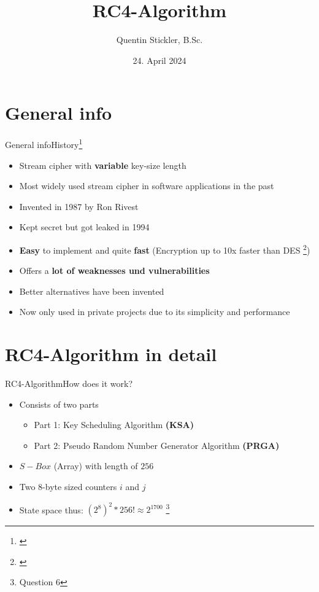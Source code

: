 \documentclass[
	aspectratio=169,	%
	onlytextwidth,		%
	t					%
	]{beamer}
\title[RC4-Algorithm]{RC4-Algorithm}
\author[Quentin Stickler]{Quentin Stickler, B.Sc.}
\date{24. April 2024} %
\begin{document}
\section{General info}

\begin{frame}[fragile]{General info}{History\footnote[frame]{\cite{stallings2005rc4}}}
	\begin{itemize}[<+->]
		\item Stream cipher with \textbf{variable} key-size length
		\item Most widely used stream cipher in software applications in the past
		\item Invented in 1987 by Ron Rivest
		\item Kept secret but got leaked in 1994
		\item \textbf{Easy} to implement and quite \textbf{fast} (Encryption up to 10x faster than DES \footnote[frame]{\cite{stovsic2012rc4}})
		\item Offers a \textbf{lot of weaknesses und vulnerabilities}
		\item Better alternatives have been invented
		\item Now only used in private projects due to its simplicity and performance
	\end{itemize}
\end{frame}

\section{RC4-Algorithm in detail}

\begin{frame}[fragile]{RC4-Algorithm}{How does it work?}
	\begin{itemize}[<+->]
		\item Consists of two parts
		\begin{itemize}
			\item Part 1: Key Scheduling Algorithm \textbf{(KSA)}
			\item Part 2: Pseudo Random Number Generator Algorithm \textbf{(PRGA)}
		\end{itemize}
		\item $S-Box$ (Array) with length of $256$
		\item Two 8-byte sized counters $i$ and $j$
		\item State space thus: $(2^{8})^2 * 256! \approx 2^{1700}$ \footnote[frame]{\footnotesize Question 6}
	\end{itemize}
\end{frame}
\end{document}
